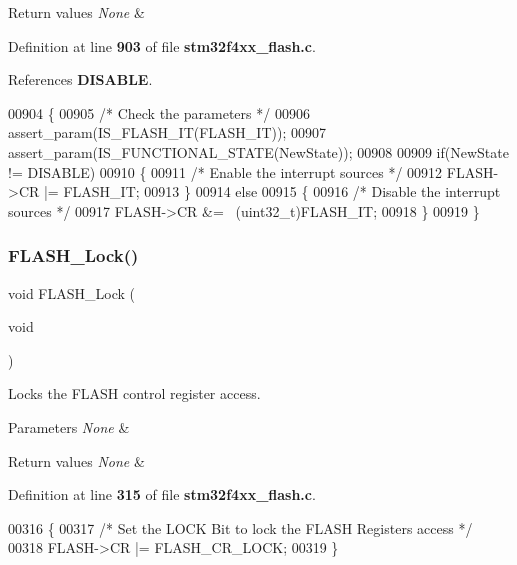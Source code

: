 \begin{DoxyRetVals}{Return values}
{\em None} & \\
\hline
\end{DoxyRetVals}


Definition at line \textbf{ 903} of file \textbf{ stm32f4xx\+\_\+flash.\+c}.



References \textbf{ D\+I\+S\+A\+B\+LE}.


\begin{DoxyCode}
00904 \{
00905   \textcolor{comment}{/* Check the parameters */}
00906   assert_param(IS_FLASH_IT(FLASH\_IT)); 
00907   assert_param(IS_FUNCTIONAL_STATE(NewState));
00908 
00909   \textcolor{keywordflow}{if}(NewState != DISABLE)
00910   \{
00911     \textcolor{comment}{/* Enable the interrupt sources */}
00912     FLASH->CR |= FLASH\_IT;
00913   \}
00914   \textcolor{keywordflow}{else}
00915   \{
00916     \textcolor{comment}{/* Disable the interrupt sources */}
00917     FLASH->CR &= ~(uint32\_t)FLASH\_IT;
00918   \}
00919 \}
\end{DoxyCode}
\mbox{\label{group__FLASH_ga46899557353c4312ddbe3f25e65df1d8}} 
\subsubsection{F\+L\+A\+S\+H\+\_\+\+Lock()}
{\footnotesize\ttfamily void F\+L\+A\+S\+H\+\_\+\+Lock (\begin{DoxyParamCaption}\item[{void}]{ }\end{DoxyParamCaption})}



Locks the F\+L\+A\+SH control register access. 


\begin{DoxyParams}{Parameters}
{\em None} & \\
\hline
\end{DoxyParams}

\begin{DoxyRetVals}{Return values}
{\em None} & \\
\hline
\end{DoxyRetVals}


Definition at line \textbf{ 315} of file \textbf{ stm32f4xx\+\_\+flash.\+c}.


\begin{DoxyCode}
00316 \{
00317   \textcolor{comment}{/* Set the LOCK Bit to lock the FLASH Registers access */}
00318   FLASH->CR |= FLASH_CR_LOCK;
00319 \}
\end{DoxyCode}
\mbox{\label{group__FLASH_ga621bf052bc381c7a37fb1f8758f5ec2e}} 
